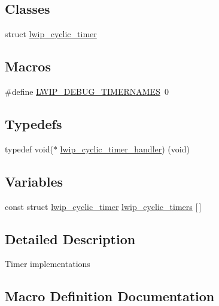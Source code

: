 \subsection*{Classes}
\begin{DoxyCompactItemize}
\item 
struct \hyperlink{structlwip__cyclic__timer}{lwip\+\_\+cyclic\+\_\+timer}
\end{DoxyCompactItemize}
\subsection*{Macros}
\begin{DoxyCompactItemize}
\item 
\#define \hyperlink{openmote-cc2538_2lwip_2src_2include_2lwip_2timeouts_8h_a9ab7e8d91b741ce44b96c68c8e4141d3}{L\+W\+I\+P\+\_\+\+D\+E\+B\+U\+G\+\_\+\+T\+I\+M\+E\+R\+N\+A\+M\+ES}~0
\end{DoxyCompactItemize}
\subsection*{Typedefs}
\begin{DoxyCompactItemize}
\item 
typedef void($\ast$ \hyperlink{openmote-cc2538_2lwip_2src_2include_2lwip_2timeouts_8h_a985c5d366b62bd179195e093ffcb7ecd}{lwip\+\_\+cyclic\+\_\+timer\+\_\+handler}) (void)
\end{DoxyCompactItemize}
\subsection*{Variables}
\begin{DoxyCompactItemize}
\item 
const struct \hyperlink{structlwip__cyclic__timer}{lwip\+\_\+cyclic\+\_\+timer} \hyperlink{openmote-cc2538_2lwip_2src_2include_2lwip_2timeouts_8h_addc06ab816f051a0fe6f280972eed142}{lwip\+\_\+cyclic\+\_\+timers} \mbox{[}$\,$\mbox{]}
\end{DoxyCompactItemize}


\subsection{Detailed Description}
Timer implementations 

\subsection{Macro Definition Documentation}
\mbox{\label{openmote-cc2538_2lwip_2src_2include_2lwip_2timeouts_8h_a9ab7e8d91b741ce44b96c68c8e4141d3}} 
